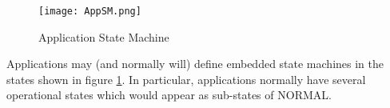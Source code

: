 \begin{figure}[ht]
 \centering
 \texttt{[image: AppSM.png]}
 \caption{Application State Machine}
 \label{fig:AppSM}
\end{figure}

Applications may (and normally will) define embedded state machines in the states shown in figure \ref{fig:AppSM}. In particular, applications normally have several operational states which would appear as sub-states of NORMAL.
